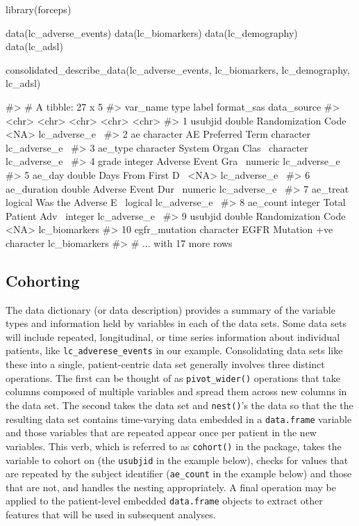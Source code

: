 \begin{Schunk}
\begin{Sinput}
library(forceps)

data(lc_adverse_events)
data(lc_biomarkers)
data(lc_demography)
data(lc_adsl)

consolidated_describe_data(lc_adverse_events,
                           lc_biomarkers,
                           lc_demography,
                           lc_adsl)
\end{Sinput}
\begin{Soutput}
#> # A tibble: 27 x 5
#>    var_name      type      label              format_sas data_source  
#>    <chr>         <chr>     <chr>              <chr>      <chr>        
#>  1 usubjid       double    Randomization Code <NA>       lc_adverse_e~
#>  2 ae            character AE Preferred Term  character  lc_adverse_e~
#>  3 ae_type       character System Organ Clas~ character  lc_adverse_e~
#>  4 grade         integer   Adverse Event Gra~ numeric    lc_adverse_e~
#>  5 ae_day        double    Days From First D~ <NA>       lc_adverse_e~
#>  6 ae_duration   double    Adverse Event Dur~ numeric    lc_adverse_e~
#>  7 ae_treat      logical   Was the Adverse E~ logical    lc_adverse_e~
#>  8 ae_count      integer   Total Patient Adv~ integer    lc_adverse_e~
#>  9 usubjid       double    Randomization Code <NA>       lc_biomarkers
#> 10 egfr_mutation character EGFR Mutation +ve~ character  lc_biomarkers
#> # ... with 17 more rows
\end{Soutput}
\end{Schunk}

\hypertarget{cohorting}{%
\subsection{Cohorting}\label{cohorting}}

The data dictionary (or data description) provides a summary of the
variable types and information held by variables in each of the data
sets. Some data sets will include repeated, longitudinal, or time series
information about individual patients, like
\texttt{lc\_adverese\_events} in our example. Consolidating data sets
like these into a single, patient-centric data set generally involves
three distinct operations. The first can be thought of as
\texttt{pivot\_wider()} operations that take columns composed of
multiple variables and spread them across new columns in the data set.
The second takes the data set and \texttt{nest()}'s the data so that the
the resulting data set contains time-varying data embedded in a
\texttt{data.frame} variable and those variables that are repeated
appear once per patient in the new variables. This verb, which is
referred to as \texttt{cohort()} in the package, takes the variable to
cohort on (the \texttt{usubjid} in the example below), checks for values
that are repeated by the subject identifier (\texttt{ae\_count} in the
example below) and those that are not, and handles the nesting
appropriately. A final operation may be applied to the patient-level
embedded \texttt{data.frame} objects to extract other features that will
be used in subsequent analyses.

